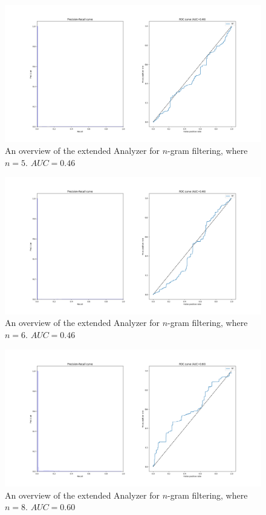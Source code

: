 \documentclass[11pt]{article}
\begin{document}
\begin{figure}[htp]
	\centering
	\includegraphics[width=\textwidth]{images/customAna-n5}
	\caption{An overview of the extended Analyzer for $n$-gram filtering, where $n = 5$. $AUC = 0.46$}
	\label{fig:ngram5}
\end{figure}
\begin{figure}[htp]
	\centering
	\includegraphics[width=\textwidth]{images/customAna-n6}
	\caption{An overview of the extended Analyzer for $n$-gram filtering, where $n = 6$. $AUC = 0.46$}
	\label{fig:ngram6}
\end{figure}
\begin{figure}[htp]
\centering
\includegraphics[width=\textwidth]{images/customAna-n8}
\caption{An overview of the extended Analyzer for $n$-gram filtering, where $n = 8$. $AUC = 0.60$}
\label{fig:ngram8}
\end{figure}
\end{document}
